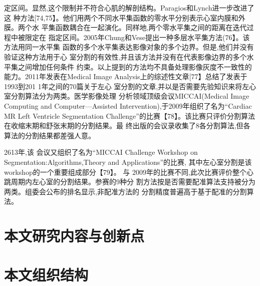 定区间。显然,这个限制并不符合心肌的解剖结构。Paragios和Lynch进一步改进了这
种方法[74,75】。他们用两个不同水平集函数的零水平分别表示心室内膜和外膜。两个水
平集函数耦合在一起演化。同样地,两个零水平集之间的距离在迭代过程中被限定在
指定区间。2005年Chung和Vese提出一种多层水平集方法(76】。该方法用同一水平集
函数的多个水平集表达影像对象的多个边界。但是,他们并没有验证这种方法用于心
室分割的有效性,并且该方法并没有在代表影像边界的多个水平集之间增加任何条件
约束。以上提到的方法均不具备处理影像灰度不一致性的能力。2011年发表在Medical
Image
 Analysis上的综述性文章[77】总结了发表于1993到201 1年之间的70篇关于左心
 室分割的文章,并以是否需要先验知识来将左心室分割算法分为两类。医学影像处理
 分析领域顶级会议MICCAI(Medical
  Image Computing
   and Computer—Assisted
   Intervention),于2009年组织了名为“Cardiac MR
    Left
     Ventricle Segmentation
     Challenge”的比赛【78】。该比赛只评价分割算法在收缩末期和舒张末期的分割结果。最
     终出版的会议录收集了8各分割算法,但各算法的分割结果都差强人意。
     
2613年,该
会议又组织了名为“MICCAI
Challenge Workshop on Segmentation:Algorithms,Theory and Applications”的比赛,
其中左心室分割是该workshop的一个重要组成部分【79】。
与 2009年的比赛不同,此次比赛评价整个心跳周期内左心室的分割结果。参赛的9种分
割方法按是否需要配准算法支持被分为两类。组委会公布的排名显示,非配准方法的
分割精度普遍高于基于配准的分割算法。





\section{本文研究内容与创新点}

\section{本文组织结构}
